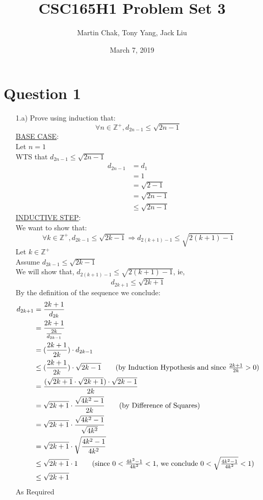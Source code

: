 \documentclass[20pt]{article}
\title{CSC165H1 Problem Set 3}
\author{Martin Chak, Tony Yang, Jack Liu}
\date{March 7, 2019}
\begin{document}
\maketitle
\newpage
\section*{Question 1}
\begin{enumerate}
    \item[1.a)] Prove using induction that: 
    \[\forall n \in \mathbb{Z^+}, d_{2n-1} \leq \sqrt{2n-1}\]
    \underline{BASE CASE}: \\
    Let $n = 1$ \\
    WTS that $d_{2n-1} \leq \sqrt{2n-1}$
    \begin{align*}
        d_{2n-1} &= d_1 
        \tag{since n = 1} \\
        &= 1 \\
        &= \sqrt{2 - 1} \\
        &= \sqrt{2n - 1}
        \tag{since n = 1}\\
        &\leq \sqrt{2n - 1}
    \end{align*}
    \underline{INDUCTIVE STEP}:\\
    We want to show that:
    \[\forall k \in \mathbb{Z^+}, 
    d_{2k-1} \leq \sqrt{2k-1} \Rightarrow
    d_{2(k+1)-1} \leq \sqrt{2(k+1)-1}
    \]
    Let $k \in \mathbb{Z^+}$\\
    Assume $d_{2k-1} \leq \sqrt{2k-1}$\\
    We will show that, $d_{2(k+1)-1} \leq \sqrt{2(k+1)-1}$, ie, 
    \[d_{2k+1} \leq \sqrt{2k+1}\]
    By the definition of the sequence we conclude:
    \begin{align*}
        d_{2k+1} &= \frac{2k+1}{d_{2k}}\\
        &= \frac{2k+1}{\frac{2k}{d_{2k-1}}}\\
        &= (\frac{2k+1}{2k}) \cdot d_{2k-1}\\
        &\leq (\frac{2k+1}{2k}) \cdot \sqrt{2k-1}
        \tag{by Induction Hypothesis and since $\frac{2k+1}{2k} > 0$}\\
        &= \frac{(\sqrt{2k+1} \cdot \sqrt{2k+1}) \cdot \sqrt{2k-1}}{2k}\\
        &= \sqrt{2k+1} \cdot \frac{\sqrt{4k^2 -1}}{2k}
        \tag{by Difference of Squares}\\
        &= \sqrt{2k+1} \cdot \frac{\sqrt{4k^2 -1}}{\sqrt{4k^2}}\\
        &= \sqrt{2k+1} \cdot \sqrt{\frac{{4k^2 -1}}{{4k^2}}}\\
        &\leq \sqrt{2k+1} \cdot 1
        \tag{since $0 < \frac{{4k^2 -1}}{{4k^2}} < 1$, we conclude 
        $0 < \sqrt{\frac{{4k^2 -1}}{{4k^2}}} < 1$}\\
        &\leq \sqrt{2k+1}
    \end{align*}
    As Required \hfill \Box
\end{enumerate}
\end{document}
